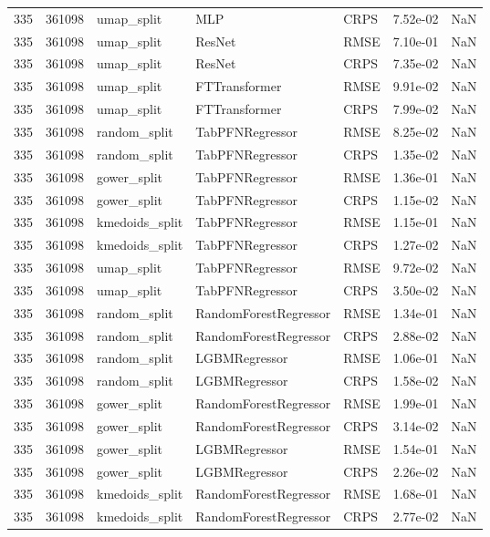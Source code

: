 \begin{tabular}{rrlllrr}
335 & 361098 & umap\_split & MLP & CRPS & 7.52e-02 & NaN \\
335 & 361098 & umap\_split & ResNet & RMSE & 7.10e-01 & NaN \\
335 & 361098 & umap\_split & ResNet & CRPS & 7.35e-02 & NaN \\
335 & 361098 & umap\_split & FTTransformer & RMSE & 9.91e-02 & NaN \\
335 & 361098 & umap\_split & FTTransformer & CRPS & 7.99e-02 & NaN \\
335 & 361098 & random\_split & TabPFNRegressor & RMSE & 8.25e-02 & NaN \\
335 & 361098 & random\_split & TabPFNRegressor & CRPS & 1.35e-02 & NaN \\
335 & 361098 & gower\_split & TabPFNRegressor & RMSE & 1.36e-01 & NaN \\
335 & 361098 & gower\_split & TabPFNRegressor & CRPS & 1.15e-02 & NaN \\
335 & 361098 & kmedoids\_split & TabPFNRegressor & RMSE & 1.15e-01 & NaN \\
335 & 361098 & kmedoids\_split & TabPFNRegressor & CRPS & 1.27e-02 & NaN \\
335 & 361098 & umap\_split & TabPFNRegressor & RMSE & 9.72e-02 & NaN \\
335 & 361098 & umap\_split & TabPFNRegressor & CRPS & 3.50e-02 & NaN \\
335 & 361098 & random\_split & RandomForestRegressor & RMSE & 1.34e-01 & NaN \\
335 & 361098 & random\_split & RandomForestRegressor & CRPS & 2.88e-02 & NaN \\
335 & 361098 & random\_split & LGBMRegressor & RMSE & 1.06e-01 & NaN \\
335 & 361098 & random\_split & LGBMRegressor & CRPS & 1.58e-02 & NaN \\
335 & 361098 & gower\_split & RandomForestRegressor & RMSE & 1.99e-01 & NaN \\
335 & 361098 & gower\_split & RandomForestRegressor & CRPS & 3.14e-02 & NaN \\
335 & 361098 & gower\_split & LGBMRegressor & RMSE & 1.54e-01 & NaN \\
335 & 361098 & gower\_split & LGBMRegressor & CRPS & 2.26e-02 & NaN \\
335 & 361098 & kmedoids\_split & RandomForestRegressor & RMSE & 1.68e-01 & NaN \\
335 & 361098 & kmedoids\_split & RandomForestRegressor & CRPS & 2.77e-02 & NaN \\

\end{tabular}
